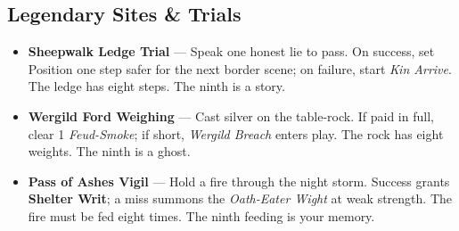 \subsection*{Legendary Sites \& Trials}
\begin{itemize}
\item \textbf{Sheepwalk Ledge Trial} --- Speak one honest lie to pass. On success, set Position one step safer for the next border scene; on failure, start \emph{Kin Arrive}. The ledge has eight steps. The ninth is a story.
\item \textbf{Wergild Ford Weighing} --- Cast silver on the table-rock. If paid in full, clear 1 \emph{Feud-Smoke}; if short, \emph{Wergild Breach} enters play. The rock has eight weights. The ninth is a ghost.
\item \textbf{Pass of Ashes Vigil} --- Hold a fire through the night storm. Success grants \textbf{Shelter Writ}; a miss summons the \emph{Oath-Eater Wight} at weak strength. The fire must be fed eight times. The ninth feeding is your memory.
\end{itemize}

